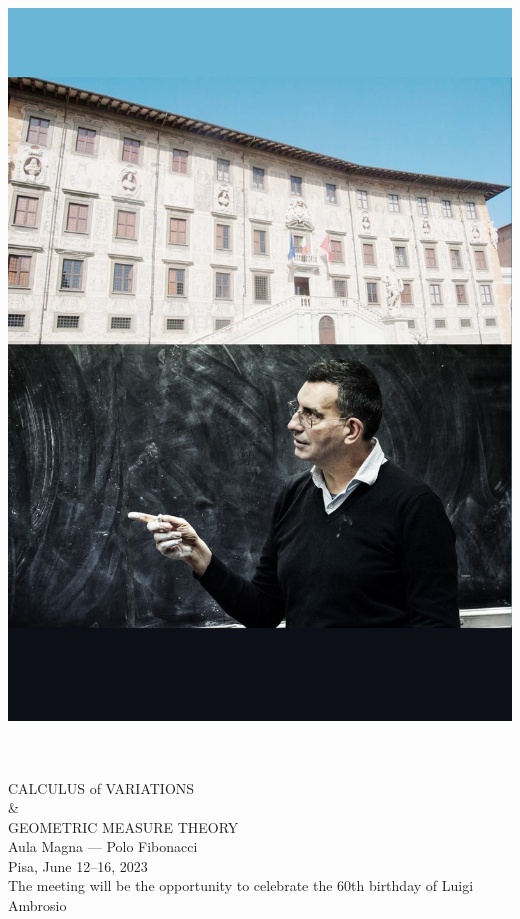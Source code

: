 \documentclass[a4paper]{article}
\newcommand{\buh}[1]{\textsf{#1}\\}
\begin{document}
\color{black}
\begin{center}
\mbox{}\\
\vspace{-0.5cm}
\includegraphics[scale=0.70]{sfondo.jpg}
\\
\vspace{-30cm}
\bigskip
\Huge
\buh{}
\large
\buh{}
\bigskip
\bf

\Huge
\buh{CALCULUS of VARIATIONS \\ \& \\ GEOMETRIC MEASURE THEORY}
\vspace{2cm}
\Large
\buh{Aula Magna --- Polo Fibonacci}
\vspace{2cm}
\huge
\buh{Pisa, June 12--16, 2023}
\Large
\bigskip
\buh{The meeting will be the opportunity to celebrate the 60th birthday of Luigi Ambrosio}
\end{center}
\end{document}
